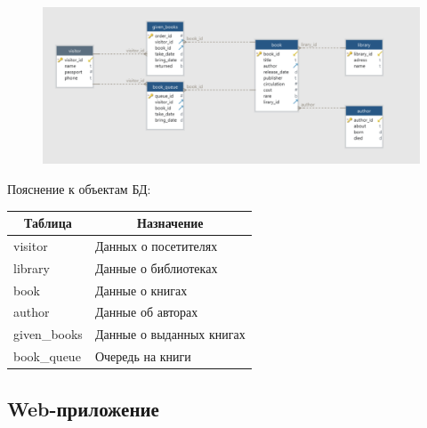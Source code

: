 \documentclass[a4paper,10pt]{article}
\begin{document}
            \begin{figure}[h]
                \includegraphics[width=1.0\textwidth]{./images/db.png}
                \centering
            \end{figure}

            Пояснение к объектам БД:

            \begin{table}[h]
                \centering
                \begin{tabular}{|l|l|}
                    \hline
                    \multicolumn{1}{|c|}{\textbf{Таблица}} & \multicolumn{1}{c|}{\textbf{Назначение}} \\ \hline
                    visitor                                & Данных о посетителях                     \\ \hline
                    library                                & Данные о библиотеках                     \\ \hline
                    book                                   & Данные о книгах                          \\ \hline
                    author                                 & Данные об авторах                        \\ \hline
                    given\_books                           & Данные о выданных книгах                 \\ \hline
                    book\_queue                            & Очередь на книги                         \\ \hline
                \end{tabular}
            \end{table}

    \newpage

        \subsection{Web-приложение}
\end{document}
